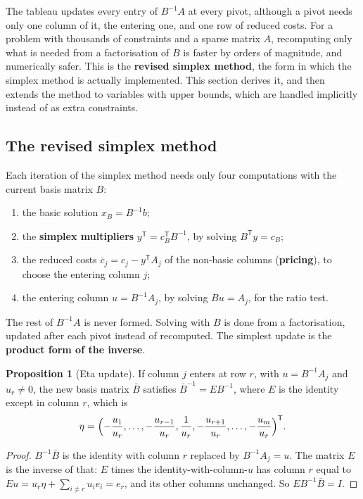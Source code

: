 \documentclass[11pt,a4paper]{article}
\numberwithin{equation}{section}
\theoremstyle{definition}
\newtheorem{prop}[thm]{Proposition}
\begin{document}
The tableau updates every entry of $B^{-1}A$ at every pivot, although a pivot needs only one column of it, the entering one, and one row of reduced costs. For a problem with thousands of constraints and a sparse matrix $A$, recomputing only what is needed from a factorisation of $B$ is faster by orders of
magnitude, and numerically safer. This is the \textbf{revised simplex method}, the form in which the simplex method is actually implemented. This section derives it, and then extends the method to variables with upper bounds, which are handled implicitly instead of as extra constraints.

\subsection{The revised simplex method}
\label{ssec:revisedmethod}

Each iteration of the simplex method needs only four computations with the current basis matrix $B$:
\begin{enumerate}[label=(\arabic*)]
\item the basic solution $x_B = B^{-1}b$;
\item the \textbf{simplex multipliers} $y^{\mathsf T} = c_B^{\mathsf T}B^{-1}$, by solving $B^{\mathsf T}y = c_B$;
\item the reduced costs $\bar c_j = c_j - y^{\mathsf T}A_j$ of the non-basic columns (\textbf{pricing}), to choose the entering column $j$;
\item the entering column $u = B^{-1}A_j$, by solving $Bu = A_j$, for the ratio test.
\end{enumerate}
The rest of $B^{-1}A$ is never formed. Solving with $B$ is done from a factorisation, updated after each pivot instead of recomputed. The simplest update is the \textbf{product form of the inverse}.

\begin{prop}[Eta update]
\label{prop:eta}
If column $j$ enters at row $r$, with $u = B^{-1}A_j$ and $u_r \neq 0$, the new basis matrix $\bar B$ satisfies $\bar B^{-1} = EB^{-1}$, where $E$ is the identity except in column $r$, which is
\[
\eta = \Bigl(-\frac{u_1}{u_r}, \ldots, -\frac{u_{r - 1}}{u_r}, \frac1{u_r}, -\frac{u_{r + 1}}{u_r}, \ldots, -\frac{u_m}{u_r}\Bigr)^{\mathsf T} .
\]
\end{prop}

\begin{proof}
$B^{-1}\bar B$ is the identity with column $r$ replaced by $B^{-1}A_j = u$. The matrix $E$ is the inverse of that: $E$ times the identity-with-column-$u$ has column $r$ equal to $Eu = u_r\eta + \sum_{i \neq r}u_ie_i = e_r$, and its other columns unchanged. So $EB^{-1}\bar B = I$.
\end{proof}
\end{document}

